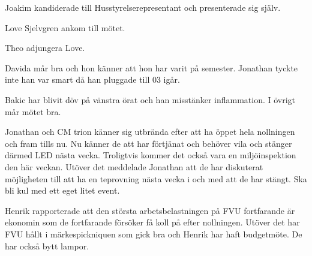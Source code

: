 \documentclass[10pt]{article}
\begin{document}
\begin{paragrafer}
\begin{fyllnadsval}

Joakim kandiderade till Husstyrelserepresentant och presenterade sig själv. 


\end{fyllnadsval}

Love Sjelvgren ankom till mötet.

Theo \ypa adjungera Love.

\Mbaby

\begin{fyllnadsval}


\end{fyllnadsval}




\begin{paragrafer}

Davida mår bra och hon känner att hon har varit på semester. Jonathan tyckte inte han var smart då han pluggade till 03 igår. 

Bakic har blivit döv på vänstra örat och han misstänker inflammation. 
I övrigt mår mötet bra. 


 
Jonathan och CM trion känner sig utbrända efter att ha öppet hela nollningen och fram tills nu. Nu känner de att har förtjänat och behöver vila och stänger därmed LED nästa vecka. 
Troligtvis kommer det också vara en miljöinspektion den här veckan. Utöver det meddelade Jonathan att de har diskuterat möjligheten till att ha en teprovning nästa vecka i och med att de har stängt. Ska bli kul med ett eget litet event. 

Henrik rapporterade att den största arbetsbelastningen på FVU fortfarande är ekonomin som de fortfarande försöker få koll på efter nollningen.
Utöver det har FVU hållt i märkespickniquen som gick bra och Henrik har haft budgetmöte. De har också bytt lampor. 


\end{paragrafer}
\end{paragrafer}
\end{document}
